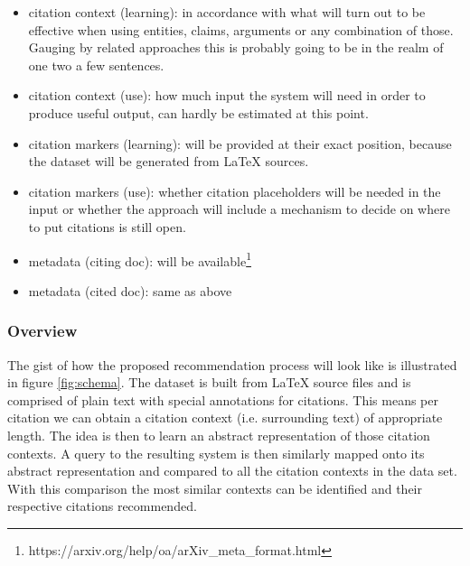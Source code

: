 \documentclass{proseminar}
\begin{document}
\begin{itemize}
    \item citation context (learning): in accordance with what will turn out to be effective when using entities, claims, arguments or any combination of those. Gauging by related approaches this is probably going to be in the realm of one two a few sentences.
    \item citation context (use): how much input the system will need in order to produce useful output, can hardly be estimated at this point.
    \item citation markers (learning): will be provided at their exact position, because the dataset will be generated from LaTeX sources.
    \item citation markers (use): whether citation placeholders will be needed in the input or whether the approach will include a mechanism to decide on where to put citations is still open.
    \item metadata (citing doc): will be available\footnote{https://arxiv.org/help/oa/arXiv\_meta\_format.html}
    \item metadata (cited doc): same as above
\end{itemize}

\subsubsection{Overview}
The gist of how the proposed recommendation process will look like is illustrated in figure \ref{fig:schema}. The dataset is built from LaTeX source files and is comprised of plain text with special annotations for citations. This means per citation we can obtain a citation context (i.e. surrounding text) of appropriate length. The idea is then to learn an abstract representation of those citation contexts. A query to the resulting system is then similarly mapped onto its abstract representation and compared to all the citation contexts in the data set. With this comparison the most similar contexts can be identified and their respective citations recommended.
\end{document}
